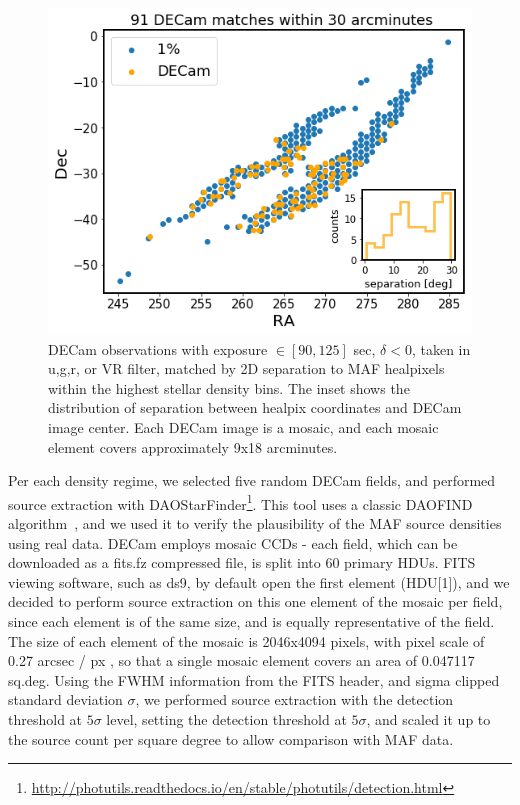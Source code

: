 \documentclass[DM,lsstdraft,toc,usenatbib]{lsstdoc}
\begin{document}
\begin{figure}
\includegraphics[width=1.0\columnwidth]{figs/Illustrate_top_1_perc_DECam_matches.png}
\caption{DECam observations with exposure $\in [90,125] $ sec, $\delta < 0$, taken in  u,g,r, or VR filter, matched by 2D separation to MAF healpixels within the highest stellar density bins. The inset shows the distribution of separation between healpix coordinates and DECam image center. Each DECam image is a mosaic, and each mosaic element covers approximately 9x18 arcminutes. }
\label{fig:decam_matches_top}
\end{figure} 

Per each density regime, we selected five random DECam fields, and performed source extraction with DAOStarFinder\footnote{\url{http://photutils.readthedocs.io/en/stable/photutils/detection.html}}.  This tool uses a classic DAOFIND algorithm~\citep{stetson1987}, and  we used it to verify the plausibility of the MAF source densities using real data.  DECam employs mosaic CCDs - each  field, which can be downloaded as a fits.fz compressed file, is split into 60 primary HDUs. FITS viewing software, such as ds9, by default open the first element (HDU[1]), and we decided to perform source extraction on this one element of the mosaic per field, since each element is of the same size, and is equally representative of the field. The size of each element of the mosaic is 2046x4094 pixels, with pixel scale of 0.27 arcsec / px , so that a single mosaic element covers an area of 0.047117 sq.deg. Using the FWHM information from the FITS header, and sigma clipped standard deviation $\sigma$, we performed source extraction with the detection threshold at $5 \sigma$ level, setting the detection threshold at $5\sigma$, and scaled it up to the source count per square degree to allow comparison with MAF data.  
\end{document}
